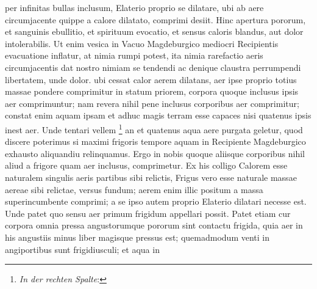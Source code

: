  per infinitas bullas inclusum, Elaterio\protect{} proprio se dilatare, ubi ab aere circumjacente quippe a calore\protect{} dilatato, comprimi desiit. Hinc apertura pororum, et sanguinis\protect{} ebullitio, et spirituum\protect{} evocatio, et sensus caloris\protect{} blandus, aut dolor intolerabilis. Ut enim vesica in Vacuo Magdeburgico mediocri Recipientis evacuatione inflatur, at nimia rumpi potest, ita nimia rarefactio aeris circumjacentis dat nostro nimiam se tendendi ac denique claustra perrumpendi libertatem, unde dolor.  ubi cessat calor\protect{} aerem dilatans, aer ipse proprio totius massae\protect{} pondere comprimitur in statum priorem,  corpora quoque  inclusus ipsis aer  comprimuntur; nam revera nihil pene  inclusus corporibus aer comprimitur; constat enim aquam ipsam et adhuc magis terram  esse capaces nisi quatenus ipsis inest aer. Unde tentari vellem \footnote{\textit{In der rechten Spalte}: } an et quatenus aqua aere purgata geletur, quod discere poterimus si maximi frigoris\protect{} tempore aquam in Recipiente Magdeburgico\protect{} exhausto aliquandiu relinquamus. Ergo in nobis quoque aliisque corporibus nihil aliud a frigore\protect{} quam aer inclusus, comprimetur. Ex his colligo Calorem\protect{} esse naturalem singulis aeris partibus sibi relictis, Frigus\protect{} vero esse naturale massae\protect{} aereae sibi relictae, versus fundum; aerem enim illic positum a massa\protect{} superincumbente comprimi; a se ipso autem  proprio Elaterio\protect{} dilatari necesse est. Unde patet quo sensu aer primum frigidum appellari possit. Patet etiam cur corpora omnia pressa angustorumque pororum sint contactu frigida, quia aer in his angustiis minus liber magisque pressus est; quemadmodum venti in angiportibus sunt frigidiusculi; et aqua in 